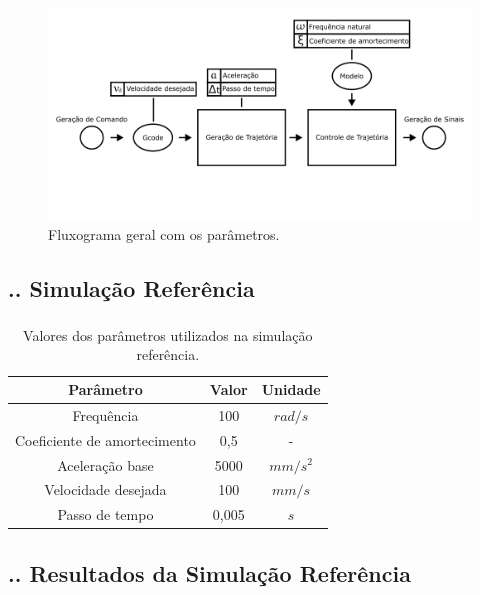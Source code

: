 \documentclass[aspectratio=169]{beamer}
\begin{document}
\begin{frame}
  \frametitle{\insertsection}
  \begin{figure}[H]
    \centering
    \caption{Fluxograma geral com os parâmetros.}
    \includegraphics[width=.9\textwidth]{fluxo_geral_var}

    \label{fig:fluxo_geral_var}
\end{figure}
\end{frame}

\subsection{\insertsectionnumber .\insertsubsectionnumber . Simulação Referência}
\begin{frame}
  \frametitle{\insertsubsection}
  \begin{table}
    \begin{center}
    \caption{Valores dos parâmetros utilizados na simulação referência.}
    \label{tab:base_params}
    \begin{tabular}{c c c}
        Parâmetro & Valor & Unidade\\ \hline
        Frequência & 100 & $rad/s$\\
        Coeficiente de amortecimento & 0,5 & - \\
        Aceleração base & 5000 & $mm/s^2$ \\
        Velocidade desejada & 100 & $mm/s$ \\
        Passo de tempo & 0,005 & $s$ \\ \hline
    \end{tabular}
    \end{center}
  \end{table}
\end{frame}

\subsection{\insertsectionnumber .\insertsubsectionnumber . Resultados da Simulação Referência}
\end{document}
